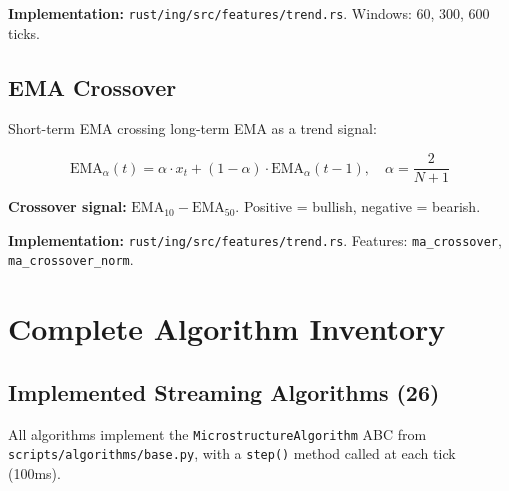 \documentclass[11pt,a4paper]{article}
\begin{document}
\textbf{Implementation:} \texttt{rust/ing/src/features/trend.rs}. Windows: 60, 300, 600 ticks.

\subsection{EMA Crossover}

Short-term EMA crossing long-term EMA as a trend signal:

\begin{equation}
\text{EMA}_\alpha(t) = \alpha \cdot x_t + (1 - \alpha) \cdot \text{EMA}_\alpha(t-1), \quad \alpha = \frac{2}{N+1}
\end{equation}

\textbf{Crossover signal:} $\text{EMA}_{10} - \text{EMA}_{50}$. Positive = bullish, negative = bearish.

\textbf{Implementation:} \texttt{rust/ing/src/features/trend.rs}. Features: \texttt{ma\_crossover}, \texttt{ma\_crossover\_norm}.

\newpage
\section{Complete Algorithm Inventory}

\subsection{Implemented Streaming Algorithms (26)}

All algorithms implement the \texttt{MicrostructureAlgorithm} ABC from \texttt{scripts/algorithms/base.py}, with a \texttt{step()} method called at each tick (100ms).
\end{document}
